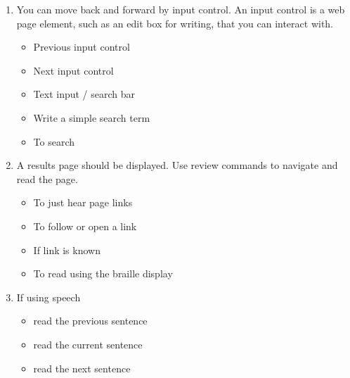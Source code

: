 \documentclass[10pt,letterpaper,twoside]{report}
\begin{document}
\begin{enumerate}
\begin{enumerate}
\begin{itemize}
		            \end{itemize}
		      \item You can move back and forward by input control.  An input control is a web page element, such as an edit box for writing, that you can interact with.
		            \begin{itemize}
			            \item Previous input control 
			            \item Next input control 
			            \item Text input / search bar 
			            \item Write a simple search term
			            \item To search 
		            \end{itemize}
		      \item A results page should be displayed. Use review commands to navigate and read the page.
		            \begin{itemize}
			            \item To just hear page links 
			            \item To follow or open a link 
			            \item If link is known 
			            \item To read using the braille display 
		            \end{itemize}
		      \item If using speech
		            \begin{itemize}
			            \item read the previous sentence 
			            \item read the current sentence 
			            \item read the next sentence 

\end{itemize}
\end{enumerate}
\end{enumerate}
\end{document}
